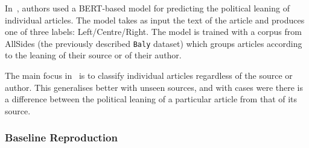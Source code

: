  

In~\citet{baly2020we}, authors used a BERT-based model for predicting the political leaning of individual articles. The model takes as input the text of the article and produces one of three labels: Left/Centre/Right. The model is trained with a corpus from AllSides  (the previously described \texttt{Baly} dataset) which groups articles %
according to the leaning of their source or of their author. %


The main focus in~\citet{baly2020we} is to classify individual articles regardless of the source or author. This generalises better with unseen sources, and with cases were there is a difference between the political leaning of a particular article from that of its source.



\subsubsection{\statusgreen Baseline Reproduction}
\label{ssec:ps_leaning_classifier}

